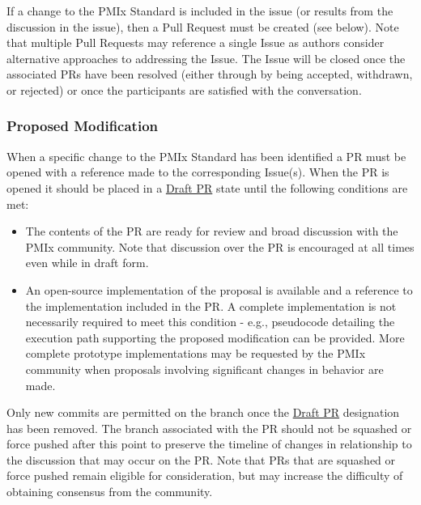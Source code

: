 \documentclass{article}
\begin{document}
If a change to the PMIx Standard is included in the issue (or results
from the discussion in the issue), then a Pull Request must be created
(see below). Note that multiple Pull Requests may reference a single
Issue as authors consider alternative approaches to addressing the
Issue. The Issue will be closed once the associated PRs have been
resolved (either through by being accepted, withdrawn, or rejected) or
once the participants are satisfied with the conversation.

\hypertarget{proposed-modification}{%
\subsubsection{Proposed Modification}%
\label{proposed-modification}}

When a specific change to the PMIx Standard has been identified a PR
must be opened with a reference made to the corresponding Issue(s). When
the PR is opened it should be placed in a
\href{https://github.blog/2019-02-14-introducing-draft-pull-requests/}{Draft
PR} state until the following conditions are met:

\begin{itemize}
\item
  The contents of the PR are ready for review and broad discussion with
  the PMIx community. Note that discussion over the PR is encouraged at
  all times even while in draft form.
\item
  An open-source implementation of the proposal is available and a
  reference to the implementation included in the PR. A complete
  implementation is not necessarily required to meet this condition -
  e.g., pseudocode detailing the execution path supporting the proposed
  modification can be provided. More complete prototype implementations
  may be requested by the PMIx community when proposals involving
  significant changes in behavior are made.
\end{itemize}

Only new commits are permitted on the branch once the
\href{https://github.blog/2019-02-14-introducing-draft-pull-requests/}{Draft
PR} designation has been removed. The branch associated with the PR
should not be squashed or force pushed after this point to preserve the
timeline of changes in relationship to the discussion that may occur on
the PR. Note that PRs that are squashed or force pushed remain eligible
for consideration, but may increase the difficulty of obtaining
consensus from the community.
\end{document}

